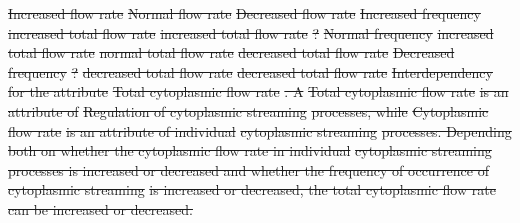\documentclass{bioinfo}
\providecommand{\DIFdel}[1]{{\protect\color{red}\sout{#1}}}                      %
\providecommand{\DIFdelbegin}{} %
\providecommand{\DIFdelend}{} %
\begin{document}
\DIFdelbegin %
\DIFdel{Increased flow rate }%
\DIFdel{Normal flow rate }%
\DIFdel{Decreased
    flow rate }%
\DIFdel{Increased frequency }%
\DIFdel{increased total flow rate }%
\DIFdel{increased total
    flow rate }%
\DIFdel{?}%
\DIFdel{Normal frequency }%
\DIFdel{increased total flow rate }%
\DIFdel{normal total flow
    rate }%
\DIFdel{decreased total flow rate}%
\DIFdel{Decreased frequency }%
\DIFdel{?}%
\DIFdel{decreased total flow rate }%
\DIFdel{decreased total
    flow rate}%
{%
\DIFdel{Interdependency for the attribute }%
\DIFdel{Total cytoplasmic flow rate}%
\DIFdel{. A }%
\DIFdel{Total cytoplasmic flow
      rate}%
\DIFdel{is an attribute of }%
\DIFdel{Regulation of cytoplasmic
      streaming}%
\DIFdel{processes, while }%
\DIFdel{Cytoplasmic flow rate}%
\DIFdel{is an
    attribute of individual }%
\DIFdel{cytoplasmic streaming}%
\DIFdel{processes. Depending both on whether the cytoplasmic flow rate in
    individual }%
\DIFdel{cytoplasmic streaming}%
\DIFdel{processes is increased or
    decreased and whether the frequency of occurrence of }%
\DIFdel{cytoplasmic streaming}%
\DIFdel{is increased or decreased, the total
    cytoplasmic flow rate can be increased or decreased.}}
\DIFdelend %
\end{document}
